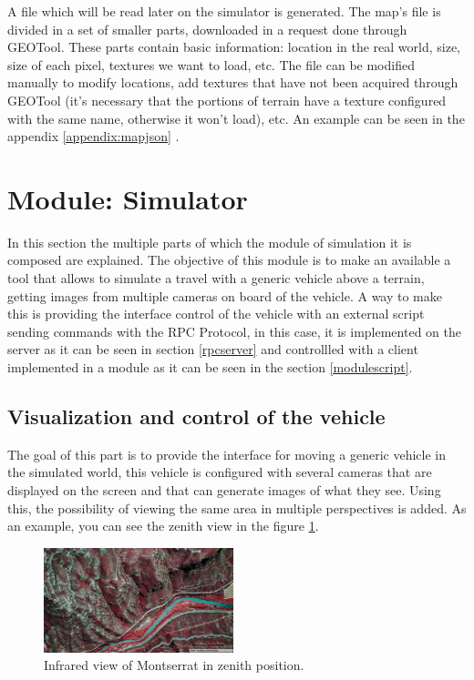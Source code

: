 \documentclass[10pt,a4paper,twocolumn,twoside]{article}
\begin{document}
A file which will be read later on the simulator is generated.  The map's file is divided in a set of smaller parts, downloaded in a request done through GEOTool. These parts contain basic information: location in the real world, size, size of each pixel, textures we want to load, etc. The file can be modified manually to modify locations, add textures that have not been acquired through GEOTool (it's necessary that the portions of terrain have a texture configured with the same name, otherwise it won't load), etc. An example can be seen in the appendix \ref{appendix:mapjson} .

\section{Module: Simulator}

In this section the multiple parts of which the module of simulation it is composed are explained. The objective of this module is to make an available a tool that allows to simulate a travel with a generic vehicle above a terrain, getting images from multiple cameras on board of the vehicle. A way to make this is providing the interface control of the vehicle with an external script sending commands with the RPC Protocol, in this case, it is implemented on the server as it can be seen in section \ref{rpcserver} and controllled with a client implemented in a module as it can be seen in the section \ref{modulescript}.

\subsection{Visualization and control of the vehicle}

The goal of this part is to provide the interface for moving a generic vehicle in the simulated world, this vehicle is configured with several cameras that are displayed on the screen and that can generate images of what they see. Using this, the possibility of viewing the same area in multiple perspectives is added. As an example, you can see the zenith view in the figure \ref{fig-montserratir}.

\begin{figure}[!h]
\centering
  	\includegraphics[width=0.49\textwidth]{cenitalviewir}
	\caption{Infrared view of Montserrat in zenith position.}
	\label{fig-montserratir}
\end{figure}
\end{document}
